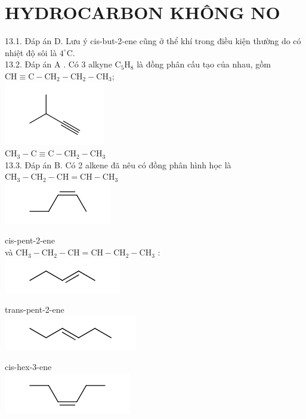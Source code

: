 \documentclass[10pt]{article}
\begin{document}
\section*{HYDROCARBON KHÔNG NO}
13.1. Đáp án D. Lưu ý cis-but-2-ene cũng ở thể khí trong điều kiện thường do có nhiệt độ sôi là $4^{\circ} \mathrm{C}$.\\
13.2. Đáp án A . Có 3 alkyne $\mathrm{C}_{5} \mathrm{H}_{8}$ là đồng phân cấu tạo của nhau, gồm\\
$\mathrm{CH} \equiv \mathrm{C}-\mathrm{CH}_{2}-\mathrm{CH}_{2}-\mathrm{CH}_{3}$;\\
\includegraphics{smile-a128aae77d28996e052ddc768d40a3a5ad377355}\\
$\mathrm{CH}_{3}-\mathrm{C} \equiv \mathrm{C}-\mathrm{CH}_{2}-\mathrm{CH}_{3}$\\
13.3. Đáp án B. Có 2 alkene đã nêu có đồng phân hình học là $\mathrm{CH}_{3}-\mathrm{CH}_{2}-\mathrm{CH}=\mathrm{CH}-\mathrm{CH}_{3}$\\
\includegraphics{smile-f750d262f4ed819a34c02ef3df1bd0fb83e95608}

cis-pent-2-ene\\
và $\mathrm{CH}_{3}-\mathrm{CH}_{2}-\mathrm{CH}=\mathrm{CH}-\mathrm{CH}_{2}-\mathrm{CH}_{3}$ :\\
\includegraphics{smile-a89db969b4a6ed30442b55c9f18991fe22f3d838}

trans-pent-2-ene\\
\includegraphics{smile-6db97c8948ae4a5b664f28cb83fd4d69f000ff80}

cis-hex-3-ene\\
\includegraphics{smile-8a3ca3e8e3ed676b1bae93aaee74dd00c0f64d1c}
\end{document}
